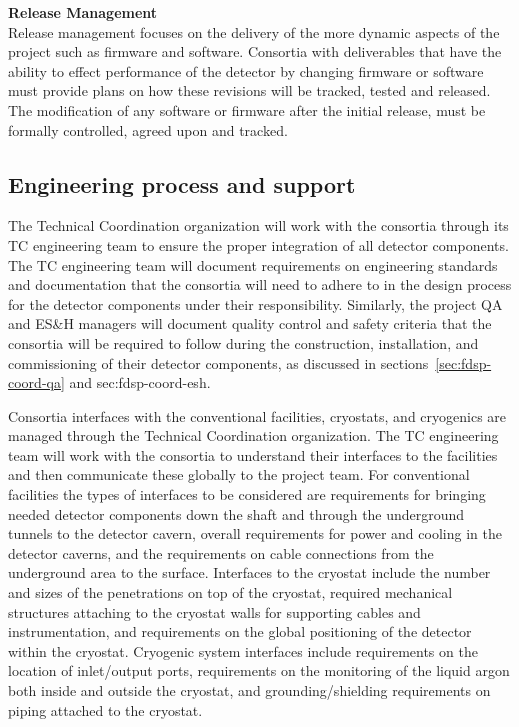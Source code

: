 {\bf Release Management}\\
Release management focuses on the delivery of the more dynamic aspects
of the project such as firmware and software.  Consortia with
deliverables that have the ability to effect performance of the
detector by changing firmware or software must provide plans on how
these revisions will be tracked, tested and released.  The
modification of any software or firmware after the initial release,
must be formally controlled, agreed upon and tracked.


\subsection{Engineering process and support}
\label{sec:fdsp-coord-integ-engr-proc}
 

The  Technical Coordination organization will work with the
consortia through its TC engineering team to ensure the proper
integration of all detector components.  The TC engineering team
will document requirements on engineering standards and documentation
that the consortia will need to adhere to in the design process for
the detector components under their responsibility.  Similarly, the
project QA and ES\&H managers will document quality control and safety
criteria that the consortia will be required to follow during the
construction, installation, and commissioning of their detector
components, as discussed in sections~\ref{sec:fdsp-coord-qa} and {sec:fdsp-coord-esh}.


Consortia interfaces with the conventional facilities, cryostats, and
cryogenics are managed through the  Technical Coordination
organization.  The TC engineering team will work with the
consortia to understand their interfaces to the facilities and then
communicate these globally to the  project team.  For conventional
facilities the types of interfaces to be considered are requirements
for bringing needed detector components down the shaft and through the
underground tunnels to the detector cavern, overall requirements for
power and cooling in the detector caverns, and the requirements on
cable connections from the underground area to the surface.
Interfaces to the cryostat include the number and sizes of the
penetrations on top of the cryostat, required mechanical structures
attaching to the cryostat walls for supporting cables and
instrumentation, and requirements on the global positioning of the
detector within the cryostat.  Cryogenic system interfaces include
requirements on the location of inlet/output ports, requirements on
the monitoring of the liquid argon both inside and outside the
cryostat, and grounding/shielding requirements on piping attached to
the cryostat.

